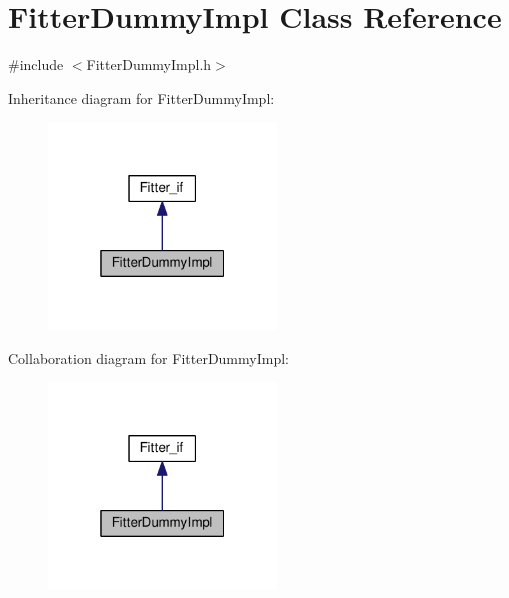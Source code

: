 \hypertarget{class_fitter_dummy_impl}{}\section{Fitter\+Dummy\+Impl Class Reference}
\label{class_fitter_dummy_impl}


{\ttfamily \#include $<$Fitter\+Dummy\+Impl.\+h$>$}



Inheritance diagram for Fitter\+Dummy\+Impl\+:\nopagebreak
\begin{figure}[H]
\begin{center}
\leavevmode
\includegraphics[width=172pt]{class_fitter_dummy_impl__inherit__graph}
\end{center}
\end{figure}


Collaboration diagram for Fitter\+Dummy\+Impl\+:\nopagebreak
\begin{figure}[H]
\begin{center}
\leavevmode
\includegraphics[width=172pt]{class_fitter_dummy_impl__coll__graph}
\end{center}
\end{figure}
